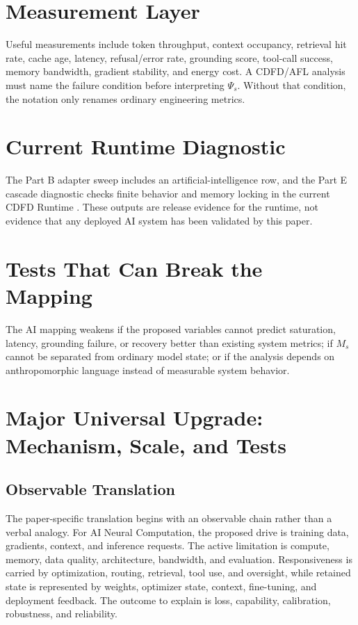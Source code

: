\documentclass[12pt,a4paper]{article}
\begin{document}
\section{Measurement Layer}

Useful measurements include token throughput, context occupancy, retrieval hit
rate, cache age, latency, refusal/error rate, grounding score, tool-call
success, memory bandwidth, gradient stability, and energy cost. A CDFD/AFL
analysis must name the failure condition before interpreting $\Psi_s$. Without
that condition, the notation only renames ordinary engineering metrics.

\section{Current Runtime Diagnostic}

The Part B adapter sweep includes an artificial-intelligence row, and the Part
E cascade diagnostic checks finite behavior and memory locking in the current
CDFD Runtime \cite{CDFDRuntime2026}. These outputs are release evidence for the
runtime, not evidence that any deployed AI system has been validated by this
paper.

\section{Tests That Can Break the Mapping}

The AI mapping weakens if the proposed variables cannot predict saturation,
latency, grounding failure, or recovery better than existing system metrics; if
$M_s$ cannot be separated from ordinary model state; or if the analysis depends
on anthropomorphic language instead of measurable system behavior.

\section{Major Universal Upgrade: Mechanism, Scale, and Tests}

\subsection{Observable Translation}

The paper-specific translation begins with an observable chain rather than a
verbal analogy. For AI Neural Computation, the proposed drive is training data, gradients, context, and inference requests.
The active limitation is compute, memory, data quality, architecture, bandwidth, and evaluation. Responsiveness is carried by
optimization, routing, retrieval, tool use, and oversight, while retained state is represented by
weights, optimizer state, context, fine-tuning, and deployment feedback. The outcome to explain is loss, capability, calibration, robustness, and reliability.
\end{document}
